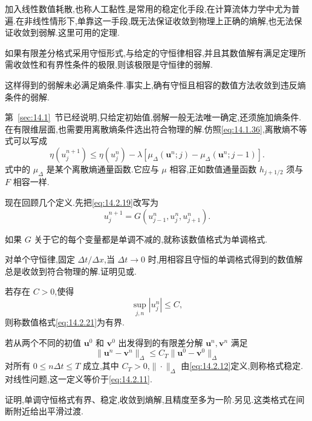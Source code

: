 加入线性数值耗散,也称人工黏性,是常用的稳定化手段,在计算流体力学中尤为普遍.在非线性情形下,单靠这一手段,既无法保证收敛到物理上正确的熵解,也无法保证收敛到弱解.这里可用的定理.
\begin{theorem*}
如果有限差分格式采用守恒形式,与给定的守恒律相容,并且其数值解有满足定理所需收敛性和有界性条件的极限,则该极限是守恒律的弱解.
\end{theorem*}
这样得到的弱解未必满足熵条件.事实上,确有守恒且相容的数值方法收敛到违反熵条件的弱解.

第~\ref{sec:14.1}~节已经说明,只给定初始值,弱解一般无法唯一确定,还须施加熵条件.在有限维层面,也需要用离散熵条件选出符合物理的解.仿照\eqref{eq:14.1.36},离散熵不等式可以写成
\[
  \eta(u_j^{n+1})\le\eta(u_j^n)
        -\lambda[\mu_\Delta(\boldsymbol{u}^n;j)-\mu_\Delta(\boldsymbol{u}^n;j-1)].
\]
式中的 \(\mu_\Delta\) 是某个离散熵通量函数.它应与 \(\mu\) 相容,正如数值通量函数 \(h_{j+1/2}\) 须与 \(F\) 相容一样.

现在回顾几个定义.先把\eqref{eq:14.2.19}改写为
\begin{equation}\label{eq:14.2.21}
  u_j^{n+1}=G(u_{j-1}^n,u_j^n,u_{j+1}^n).
\end{equation}
\begin{definition*}
如果 \(G\) 关于它的每个变量都是单调不减的,就称该数值格式为{\heiti 单调格式}.
\end{definition*}
对单个守恒律,固定 \(\Delta t/\Delta x\),当 \(\Delta t\to0\) 时,用相容且守恒的单调格式得到的数值解总是收敛到符合物理的解.证明见或.

\begin{definition*}
若存在 \(C>0\),使得
\[
  \sup_{j,n}|u_j^n|\le C,
\]
则称数值格式\eqref{eq:14.2.21}为{\heiti 有界}.
\end{definition*}
\begin{definition*}
若从两个不同的初值 \(\boldsymbol{u}^0\) 和 \(\boldsymbol{v}^0\) 出发得到的有限差分解 \(\boldsymbol{u}^n,\boldsymbol{v}^n\) 满足
\[
  \|\boldsymbol{u}^n-\boldsymbol{v}^n\|_\Delta
     \le C_T\|\boldsymbol{u}^0-\boldsymbol{v}^0\|_\Delta
\]
对所有 \(0\le n\Delta t\le T\) 成立,其中 \(C_T>0\),\(\|\cdot\|_\Delta\) 由\eqref{eq:14.2.12}定义,则称格式{\heiti 稳定}.对线性问题,这一定义等价于\eqref{eq:14.2.11}.
\end{definition*}

证明,单调守恒格式有界、稳定,收敛到熵解,且精度至多为一阶.另见.这类格式在间断附近给出平滑过渡.

